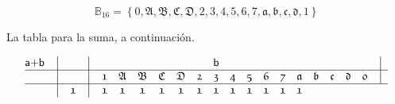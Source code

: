 \documentclass[final,12pt,a4paper,twoside,fleqn]{extbook}
\newcommand{\set}[1]{\ensuremath{\left\lbrace{#1}\right\rbrace}}
\newcommand{\setB}{\ensuremath{\mathbb{B}}}
\theoremstyle{definition}
\theoremstyle{remark}
\begin{document}
\begin{equation}
\setB_{16} =
\set{
\mathfrak{0},
\mathfrak{A},\mathfrak{B},\mathfrak{C},\mathfrak{D},
\mathfrak{2},\mathfrak{3},\mathfrak{4},
\mathfrak{5},\mathfrak{6},\mathfrak{7},
\mathfrak{a},\mathfrak{b},\mathfrak{c},\mathfrak{d},
\mathfrak{1}
}
\end{equation}



	La tabla para la suma, a continuación.



\begin{equation}
  \begin{array}{@{}*{22}c@{}}
      {\textsf{a+b}}&%
      \big\vert       &%
      {}            &%
      \big\vert       &%
      {}            &%
      {}            &%
      {}            &%
      {}            &%
      {}            &%
      {}            &%
      {\textsf{b}}  &%
      {}            &%
      {}            &%
      {}            &%
      {}            &%
      {}            &%
      {}            &%
      {}            &%
      {}            &%
      {}            &%
      \big\vert        %
      \\ \hline \nonumber
      {}            &%
      \big\vert       &%
      {}            &%
      \big\vert       &%
      {\mathfrak{1}}&%
      {\mathfrak{A}}&%
      {\mathfrak{B}}&%
      {\mathfrak{C}}&%
      {\mathfrak{D}}&%
      {\mathfrak{2}}      &%
      {\mathfrak{3}}       &%
      {\mathfrak{4}}      &%
      {\mathfrak{5}}      &%
      {\mathfrak{6}}    &%
      {\mathfrak{7}}       &%
      {\mathfrak{a}}&%
      {\mathfrak{b}}&%
      {\mathfrak{c}}&%
      {\mathfrak{d}}&%
      {\mathfrak{0}}&%
      \big\vert        %
      \\ \hline \nonumber
      {}            &%
      \big\vert       &%
      {\mathfrak{1}}&%
      \big\vert       &%
      {\mathfrak{1}}&%
      {\mathfrak{1}}&%
      {\mathfrak{1}}&%
      {\mathfrak{1}}&%
      {\mathfrak{1}}&%
      {\mathfrak{1}}&%
      {\mathfrak{1}}&%
      {\mathfrak{1}}&%
      {\mathfrak{1}}&%
      {\mathfrak{1}}&%
      {\mathfrak{1}}&%
      {\mathfrak{1}}&%

\end{array}
\end{equation}
\end{document}
